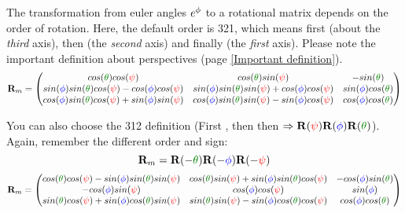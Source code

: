 The transformation from euler angles $ \eu e$ to a rotational matrix depends on the order of rotation. Here, the default order is 321, which means first  (about the \emph{third} axis), then  (the \emph{second} axis) and finally (the \emph{first} axis). Please note the important definition about perspectives (page \ref{Important definition}).
\begin{equation}
\mat R_m = \begin{pmatrix}
cos(\Pitch)cos(\Yaw)									& cos(\Pitch)sin(\Yaw)									& -sin(\Pitch)			\\
sin(\Roll)sin(\Pitch)cos(\Yaw) - cos(\Roll)cos(\Yaw)	& sin(\Roll)sin(\Pitch)sin(\Yaw) + cos(\Roll)cos(\Yaw)	& sin(\Roll)cos(\Pitch)	\\
cos(\Roll)sin(\Pitch)cos(\Yaw) + sin(\Roll)sin(\Yaw)	& cos(\Roll)sin(\Pitch)sin(\Yaw) - sin(\Roll)cos(\Yaw)	& cos(\Roll)cos(\Pitch)
\end{pmatrix}\end{equation}

You can also choose the 312 definition (First , then   then  $\Rightarrow \mat R(\Yaw) \mat R(\Roll)  \mat R(\Pitch)$). Again, remember the different order and sign:
\begin{equation}
\mat R_m = \mat R(-\Pitch) \mat R(-\Roll)  \mat R(-\Yaw)
\end{equation}
\begin{equation}
\mat R_m = \begin{pmatrix}
cos(\Pitch)cos(\Yaw)-sin(\Roll)sin(\Pitch)sin(\Yaw)		& cos(\Pitch)sin(\Yaw) + sin(\Roll)sin(\Pitch)cos(\Yaw)	& -cos(\Roll)sin(\Pitch) \\
-cos(\Roll)sin(\Yaw)									& cos(\Roll)cos(\Yaw)									& sin(\Roll)		\\
sin(\Pitch)cos(\Yaw) + sin(\Roll)cos(\Pitch)sin(\Yaw)	& sin(\Pitch)sin(\Yaw)-sin(\Roll)cos(\Pitch)cos(\Yaw)	& cos(\Roll)cos(\Pitch)
\end{pmatrix}\end{equation}
